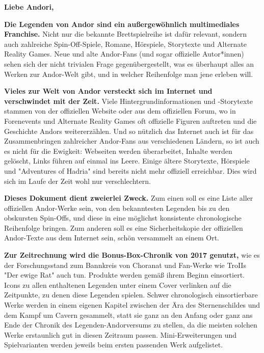 \documentclass[10pt, a4paper, oneside]{book}
\begin{document}
\maketitle







\thispagestyle{plain}%


\setcounter{page}{3} %

\textbf{Liebe Andori,}

\begin{multicols}{2}

\textbf{Die Legenden von Andor sind ein außergewöhnlich multimediales Franchise.} Nicht nur die bekannte Brettspielreihe ist dafür relevant, sondern auch zahlreiche Spin-Off-Spiele, Romane, Hörspiele, Storytexte und Alternate Reality Games. Neue und alte Andor-Fans (und sogar offizielle Autor*innen) sehen sich der nicht trivialen Frage gegenübergestellt, was es überhaupt alles an Werken zur Andor-Welt gibt, und in welcher Reihenfolge man jene erleben will.\bigskip

\textbf{Vieles zur Welt von Andor versteckt sich im Internet und verschwindet mit der Zeit.} Viele Hintergrundinformationen und -Storytexte stammen von der offiziellen Website oder aus dem offiziellen Forum, wo in Forenevents und Alternate Reality Games oft offizielle Figuren auftreten und die Geschichte Andors weitererzählen. Und so nützlich das Internet auch ist für das Zusammenbringen zahlreicher Andor-Fans aus verschiedenen Ländern, so ist auch es nicht für die Ewigkeit: Webseiten werden überarbeitet, Inhalte werden gelöscht, Links führen auf einmal ins Leere. Einige ältere Storytexte, Hörspiele und "Adventures of Hadria" sind bereits nicht mehr offiziell erreichbar. Dies wird sich im Laufe der Zeit wohl nur verschlechtern.\bigskip

\textbf{Dieses Dokument dient zweierlei Zweck. } 
Zum einen soll es eine Liste aller offiziellen Andor-Werke sein, von den bekanntesten Legenden bis zu den obskursten Spin-Offs, und diese in eine möglichst konsistente chronologische Reihenfolge bringen.
Zum anderen soll es eine Sicherheitskopie der offiziellen Andor-Texte aus dem Internet sein, schön versammelt an einem Ort.\bigskip

\textbf{Zur Zeitrechnung wird die Bonus-Box-Chronik von 2017 genutzt,} wie es der Forschungsstand zum Bannkreis von Choranat und Fan-Werke wie TroIIs "Der ewige Rat" auch tun. Produkte werden gemäß ihrem Beginn einsortiert. Icons zu allen enthaltenen Legenden unter einem Cover verlinken auf die Zeitpunkte, zu denen diese Legenden spielen. Schwer chronologisch einsortierbare Werke werden in einem eigenen Kapitel zwischen der Ära des Sternenschildes und dem Kampf um Cavern gesammelt, statt sie ganz an den Anfang oder ganz ans Ende der Chronik des Legenden-Andorversums zu stellen, da die meisten solchen Werke erstaunlich gut in diesen Zeitraum passen. Mini-Erweiterungen und Spielvarianten werden jeweils beim ersten passenden Werk aufgelistet.\bigskip


\end{multicols}
\end{document}
